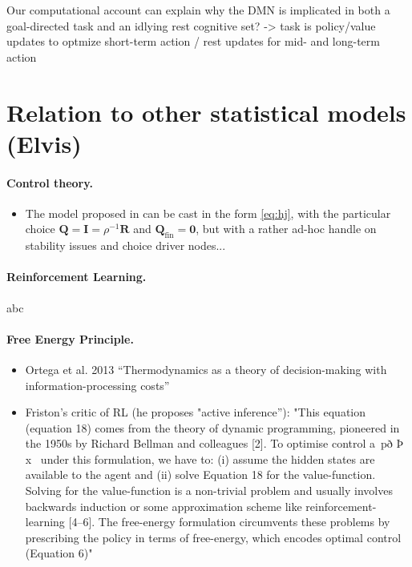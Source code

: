 \documentclass{article} %
\newcommand{\R}{\mathbb{R}}
\def\R{\mathbf{R}}
\def\Q{\mathbf{Q}}
\begin{document}
Our computational account can explain why the DMN is implicated in both a goal-directed task and an idlying rest cognitive set? -> task is policy/value updates to optmize short-term action / rest updates for mid- and long-term action


\section{Relation to other statistical models (Elvis)}
\paragraph{Control theory.}
\begin{itemize}
  \item The model proposed in \cite{betzel2016} can be cast in the form \eqref{eq:hj}, with the particular choice $\Q = \textbf{I} = \rho^{-1}\R$ and $\Q_{\text{fin}} = \textbf{0}$, but with a rather ad-hoc handle on stability issues and choice driver nodes...
\end{itemize}

\paragraph{Reinforcement Learning.}
abc

\paragraph{Free Energy Principle.}
\begin{itemize}
  \item Ortega et al. 2013 \cite{ortega2013thermodynamics} ``Thermodynamics as a theory of decision-making with information-processing costs''
\item Friston's critic of RL \cite{fristonAIorRL} (he proposes "active inference''): "This equation (equation 18) comes from the theory of dynamic programming,
pioneered in the 1950s by Richard Bellman and colleagues [2]. To
optimise control a~pð Þ x~ under this formulation, we have to: (i)
assume the hidden states are available to the agent and (ii) solve
Equation 18 for the value-function. Solving for the value-function
is a non-trivial problem and usually involves backwards induction
or some approximation scheme like reinforcement-learning [4–6].
The free-energy formulation circumvents these problems by
prescribing the policy in terms of free-energy, which encodes
optimal control (Equation 6)"
  \end{itemize}
\end{document}
